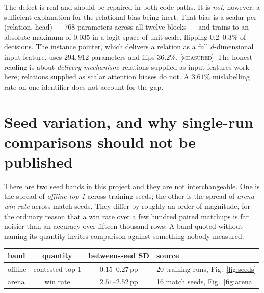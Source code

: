 \documentclass[11pt,a4paper]{article}
\newcommand{\tagM}{\textcolor{cV2}{\textsc{[measured]}}}
\begin{document}
\noindent
The defect is real and should be repaired in both code paths. It is
\emph{not}, however, a sufficient explanation for the relational bias being
inert. That bias is a scalar per (relation, head) --- $768$ parameters across all
twelve blocks --- and trains to an absolute maximum of $0.035$ in a logit space
of unit scale, flipping $0.2$--$0.3\%$ of decisions. The instance pointer, which
delivers a relation as a full $d$-dimensional input feature, uses $294{,}912$
parameters and flips $36.2\%$. \tagM\ The honest reading is about
\emph{delivery mechanism}: relations supplied as input features work here;
relations supplied as scalar attention biases do not. A $3.61\%$ mislabelling
rate on one identifier does not account for the gap.

\section{Seed variation, and why single-run comparisons should not be published}
\label{sec:seeds}

There are two seed bands in this project and they are not interchangeable. One
is the spread of \emph{offline top-1} across training seeds; the other is the
spread of \emph{arena win rate} across match seeds. They differ by roughly an
order of magnitude, for the ordinary reason that a win rate over a few hundred
paired matchups is far noisier than an accuracy over fifteen thousand rows. A
band quoted without naming its quantity invites comparison against something
nobody measured.

\begin{center}
\begin{tabular}{lccl}
\toprule
band & quantity & between-seed SD & source \\
\midrule
offline & contested top-1 & $0.15$--$0.27$\,pp & 20 training runs, Fig.~\ref{fig:seeds} \\
arena   & win rate        & $2.51$--$2.52$\,pp & 16 match seeds, Fig.~\ref{fig:arena} \\
\bottomrule
\end{tabular}
\end{center}
\end{document}
